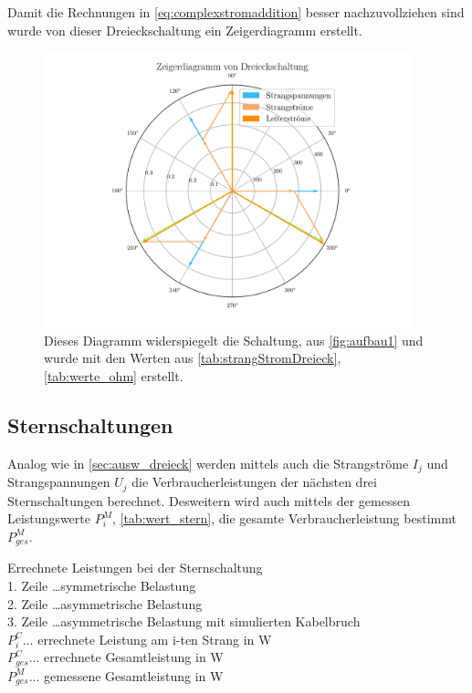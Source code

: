\documentclass[12pt,english,ngerman]{scrartcl}
\begin{document}
Damit die Rechnungen in \autoref{eq:complexstromaddition} besser
nachzuvollziehen sind wurde von dieser Dreieckschaltung ein Zeigerdiagramm
erstellt.

\begin{figure}[H]
	\begin{center}
		\includegraphics[width = 0.95\textwidth]{figures/zeigerDreieck.pdf}
	\end{center}
	\caption[Zeigerdiagramm einer sysmetrisch ohmsch-belastete Dreieckschaltung]{ Dieses
		Diagramm widerspiegelt die Schaltung, aus \autoref{fig:aufbau1} und wurde mit
		den Werten aus \autoref{tab:strangStromDreieck}, \autoref{tab:werte_ohm}
		erstellt.
	}\label{fig:zeigerDreieck}
\end{figure}

\subsection{Sternschaltungen}\label{sec:aus_stern}

Analog wie in \autoref{sec:ausw_dreieck} werden mittels auch die Strangströme
$I_j$ und Strangspannungen $U_j$ die Verbraucherleistungen der nächsten drei
Sternschaltungen berechnet. Desweitern wird auch mittels der gemessen
Leistungswerte $P_i^M$, \autoref{tab:wert_stern}, die gesamte
Verbraucherleistung bestimmt $P_{ges}^{M}$.

\begin{table}[H]
	\caption[Errechnete Leistungen bei der Sternschaltung]{Errechnete Leistungen bei der
		Sternschaltung                                                    \\
		1. Zeile \dots symmetrische Belastung                             \\
		2. Zeile \dots asymmetrische Belastung                            \\
		3. Zeile \dots asymmetrische Belastung mit simulierten Kabelbruch \\
		$P_i^C \dots$ errechnete Leistung am i-ten Strang in W            \\
		$P_{ges}^C \dots$ errechnete Gesamtleistung in W                  \\
		$P_{ges}^M \dots$ gemessene Gesamtleistung in W
	}\label{tab:powerStern}
	\centering
	
\end{table}
\end{document}
